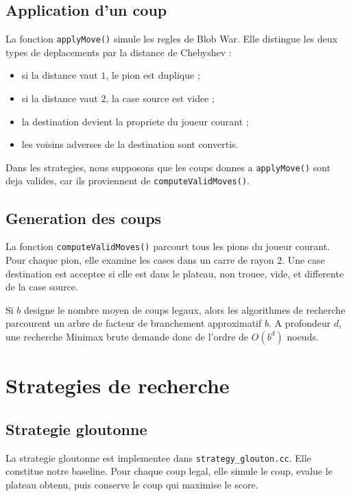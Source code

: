 \documentclass[12pt,a4paper]{article}
\begin{document}
    \subsection{Application d'un coup}

    La fonction \texttt{applyMove()} simule les regles de Blob War. Elle distingue les deux types de
    deplacements par la distance de Chebyshev :

    \begin{itemize}[nosep]
    \item si la distance vaut $1$, le pion est duplique ;
    \item si la distance vaut $2$, la case source est videe ;
    \item la destination devient la propriete du joueur courant ;
    \item les voisins adverses de la destination sont convertis.
    \end{itemize}

    Dans les strategies, nous supposons que les coups donnes a \texttt{applyMove()} sont deja valides,
    car ils proviennent de \texttt{computeValidMoves()}.

    \subsection{Generation des coups}

    La fonction \texttt{computeValidMoves()} parcourt tous les pions du joueur courant. Pour chaque pion,
    elle examine les cases dans un carre de rayon $2$. Une case destination est acceptee si elle est dans
    le plateau, non trouee, vide, et differente de la case source.

    Si $b$ designe le nombre moyen de coups legaux, alors les algorithmes de recherche parcourent un arbre
    de facteur de branchement approximatif $b$. A profondeur $d$, une recherche Minimax brute demande
    donc de l'ordre de $O(b^d)$ noeuds.


    \section{Strategies de recherche}

    \subsection{Strategie gloutonne}

    La strategie gloutonne est implementee dans \texttt{strategy\_glouton.cc}. Elle constitue notre
    baseline. Pour chaque coup legal, elle simule le coup, evalue le plateau obtenu, puis conserve le
    coup qui maximise le score.
\end{document}
